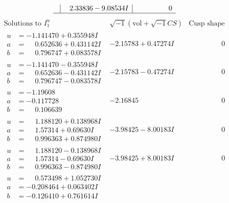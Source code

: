 \documentclass[1p]{elsarticle_modified}
\theoremstyle{definition}
\newcommand{\I}{\sqrt{-1}}
\begin{document}
$$\begin{array}{c|c|c}
 & \phantom{-}2.33836 - 9.08534 I & \phantom{-0.000000 } 0\\
 \hline 
 \end{array}$$\newpage$$\begin{array}{c|c|c}  
\text{Solutions to }I^u_{1}& \I (\text{vol} + \sqrt{-1}CS) & \text{Cusp shape}\\
 \hline 
\begin{aligned}
u &= -1.141470 + 0.355948 I \\
a &= \phantom{-}0.652636 + 0.431142 I \\
b &= \phantom{-}0.796747 + 0.083578 I\end{aligned}
 & -2.15783 + 0.47274 I & \phantom{-0.000000 } 0 \\ \hline\begin{aligned}
u &= -1.141470 - 0.355948 I \\
a &= \phantom{-}0.652636 - 0.431142 I \\
b &= \phantom{-}0.796747 - 0.083578 I\end{aligned}
 & -2.15783 - 0.47274 I & \phantom{-0.000000 } 0 \\ \hline\begin{aligned}
u &= -1.19608\phantom{ +0.000000I} \\
a &= -0.117728\phantom{ +0.000000I} \\
b &= \phantom{-}0.106639\phantom{ +0.000000I}\end{aligned}
 & -2.16845\phantom{ +0.000000I} & \phantom{-0.000000 } 0 \\ \hline\begin{aligned}
u &= \phantom{-}1.188120 + 0.138968 I \\
a &= \phantom{-}1.57314 + 0.69630 I \\
b &= \phantom{-}0.996363 + 0.874980 I\end{aligned}
 & -3.98425 - 8.00183 I & \phantom{-0.000000 } 0 \\ \hline\begin{aligned}
u &= \phantom{-}1.188120 - 0.138968 I \\
a &= \phantom{-}1.57314 - 0.69630 I \\
b &= \phantom{-}0.996363 - 0.874980 I\end{aligned}
 & -3.98425 + 8.00183 I & \phantom{-0.000000 } 0 \\ \hline\begin{aligned}
u &= \phantom{-}0.573498 + 1.052730 I \\
a &= -0.208464 + 0.063402 I \\
b &= -0.126410 + 0.761614 I\end{aligned}

\end{array}$$
\end{document}
